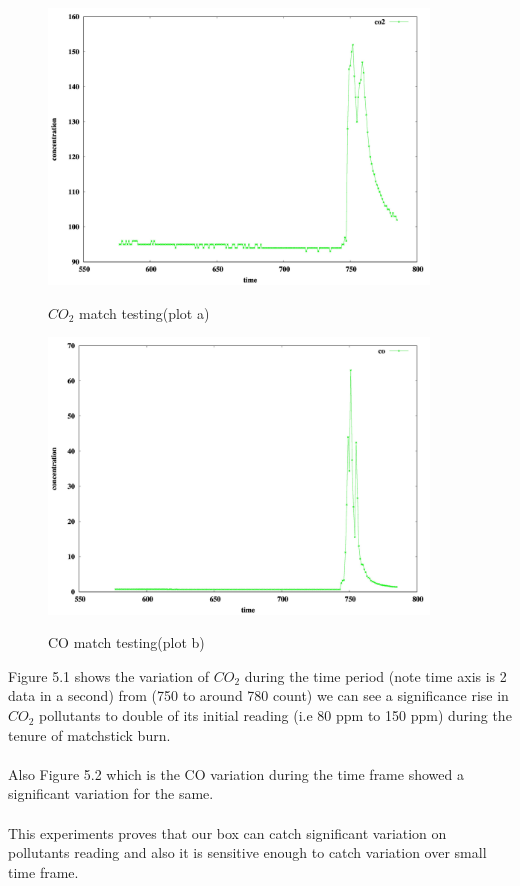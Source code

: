 \begin{figure}
\centering
\includegraphics[width=0.9\textwidth]{./co2_match1}\\[0.1in]
\label{fig:$CO_2$ match testing}
\caption{$CO_2$ match testing(plot a)}
\end{figure}
\begin{figure}
\centering
\includegraphics[width=0.9\textwidth]{./co_match1}\\[0.1in]
\label{CO match testing}
\caption{CO match testing(plot b)}
\end{figure}

Figure 5.1 shows the variation of $CO_2$ during the time period (note time axis is 2 data in a second) from (750 to around 780 count) we can see a significance rise in $CO_2$ pollutants to double of its initial reading (i.e 80 ppm to 150 ppm) during the tenure of matchstick burn.
\\
\\
Also Figure 5.2 which is the CO variation during the time frame showed a significant variation for the same.
\\
\\
This experiments proves that our box can catch significant variation on pollutants reading and also it is sensitive enough to catch variation over small time frame.

